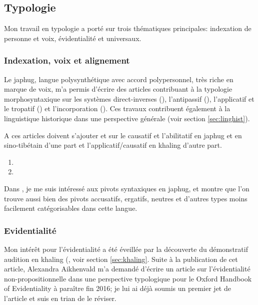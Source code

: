 \documentclass[oldfontcommands,oneside,a4paper,11pt]{article}
\begin{document}
\subsection{Typologie} \label{sec:typologie}

Mon travail en typologie a porté sur trois thématiques principales: indexation de personne et voix, évidentialité et universaux.

\subsubsection{Indexation, voix et alignement}
Le japhug, langue polysynthétique avec accord polypersonnel, très riche en marque de voix, m'a permis d'écrire des articles contribuant à la typologie morphosyntaxique sur les systèmes direct-inverses (\citealt{jacques14inverse, jacques12agreement}), l'antipassif (\citealt{jacques14antipassive}), l'applicatif et le tropatif (\citealt{jacques13tropative}) et l'incorporation (\citealt{jacques12incorp}). Ces travaux contribuent également à la linguistique historique dans une perspective générale (voir section  \ref{sec:linghist}).

A ces articles doivent s'ajouter \citet{jacques15causative} et  \citet{jacques15derivational.khaling} sur le causatif et l'abilitatif en japhug et en sino-tibétain d'une part et l'applicatif/causatif en khaling d'autre part.

\begin{enumerate}
\item  {}
\item  {}
\end{enumerate} 

Dans \citet{jacques16relatives}, je me suis intéressé aux pivots syntaxiques en japhug, et montre que l'on trouve aussi bien des pivots accusatifs, ergatifs, neutres et d'autres types moins facilement catégorisables dans cette langue.

\subsubsection{Evidentialité}\label{sec:evd}
Mon intérêt pour l'évidentialité a été éveillée par la découverte du démonstratif audition en khaling (\citealt{jacques14auditory}, voir section \ref{sec:khaling}. Suite à la publication de cet article, Alexandra Aikhenvald m'a demandé d'écrire un article sur l'évidentialité non-propositionnelle dans une perspective typologique pour le Oxford Handbook of Evidentiality à paraître fin 2016; je lui ai déjà soumis un premier jet de l'article et suis en trian de le réviser.
\end{document}
